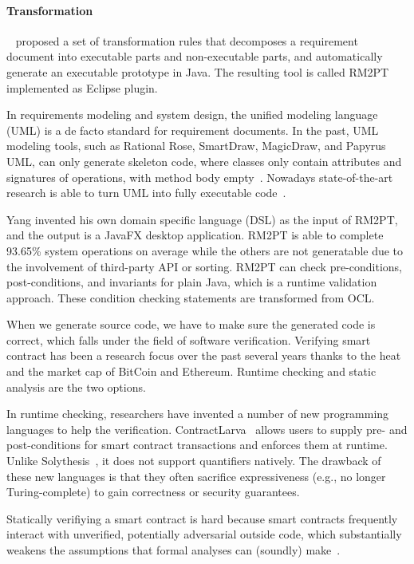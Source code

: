 \paragraph*{Transformation}
~\cite{yang2019automated} proposed a set of transformation rules that decomposes a requirement document into executable parts and non-executable parts, and automatically generate an executable prototype in Java.
The resulting tool is called RM2PT implemented as Eclipse plugin.

In requirements modeling and system design, the unified modeling language (UML) is a de facto standard for requirement documents.
In the past, UML modeling tools, such as Rational Rose, SmartDraw, MagicDraw, and Papyrus UML, can only generate skeleton code, where classes only contain attributes and signatures of operations, with method body empty~\cite{regep2000using}. Nowadays state-of-the-art research is able to turn UML into fully executable code~\cite{ciccozzi2019execution}.

Yang invented his own domain specific language (DSL) as the input of RM2PT, and the output is a JavaFX desktop application. RM2PT is able to complete 93.65\% system operations on average while the others are not generatable due to the involvement of third-party API or sorting.
RM2PT can check pre-conditions, post-conditions, and invariants for plain Java, which is a runtime validation approach.
These condition checking statements are transformed from OCL.

When we generate source code, we have to make sure the generated code is correct, which falls under the field of software verification.
Verifying smart contract has been a research focus over the past several years thanks to the heat and the market cap of BitCoin and Ethereum.
Runtime checking and static analysis are the two options.


In runtime checking, researchers have invented a number of new programming languages to help the verification.
ContractLarva~\cite{ellul2018runtime} allows users to supply pre- and post-conditions for smart contract transactions and enforces them at runtime. Unlike Solythesis~\cite{li2020securing}, it does not support quantifiers natively.
The drawback of these new languages is that they often sacrifice expressiveness (e.g., no longer Turing-complete) to gain correctness or security guarantees.

Statically verifiying a smart contract is hard because
smart contracts frequently interact with unverified, potentially adversarial outside code, which substantially weakens the assumptions that formal analyses can (soundly) make~\cite{bram2021rich}.

